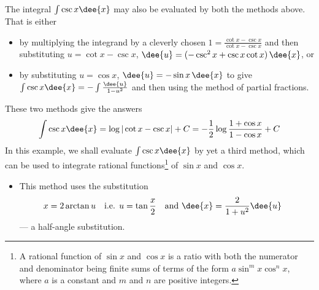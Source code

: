 \begin{eg}[$\int \csc x\dee{x}$ --- by the $u=\tan\frac{x}{2}$ substitution]
						      \label{eg:TRGINToptc}
\soln The integral $\int \csc x\dee{x}$ may also be evaluated by both
the methods above. That is either
\begin{itemize}
\item by multiplying the integrand by a cleverly chosen $1=\frac{\cot x-\csc x}{\cot
x-\csc x}$ and  then substituting $u=\cot x -\csc x$,
$\dee{u} = (-\csc^2 x+\csc x \cot x)\,\dee{x}$, or
\item by substituting $u=\cos x$, $\dee{u}=-\sin x\,\dee{x}$ to give
$\int \csc x\dee{x}=-\int\frac{\dee{u}}{1-u^2}$ and then using the
method of partial fractions.
\end{itemize}
These two methods give the answers
\begin{equation}\label{eq:INTcscInt}
\int \csc x\dee{x}=\log|\cot x-\csc x|+C
=-\frac{1}{2}\log \frac{1+\cos x}{1-\cos x}+C
\end{equation}
In this example, we shall evaluate $\int\csc x\dee{x}$ by yet a third method,
which can be used to integrate rational functions\footnote{A rational function of $\sin
x$
and $\cos x$ is a ratio with both the numerator and denominator being finite sums of
terms of the form $a\sin^m x\cos^n x$, where $a$ is a constant and $m$ and $n$ are
positive integers.} of $\sin x$ and $\cos x$.

\begin{itemize}
 \item This method uses the substitution
\begin{align*}
x&=2\arctan u & \text{i.e. } u &=\tan\frac{x}{2} & \text{and }
\dee{x}&=\frac{2}{1+u^2}\dee{u}
\end{align*}
--- a half-angle substitution.


\end{itemize}
\end{eg}

